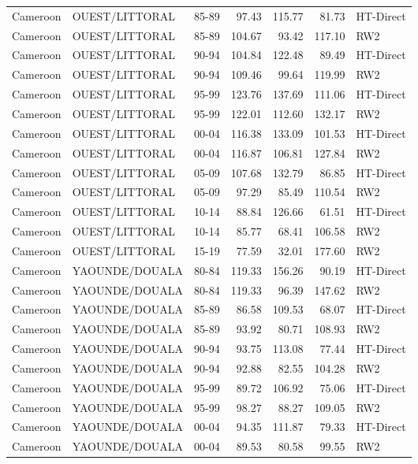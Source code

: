 \begin{longtable}{lllrrrl}
  Cameroon & OUEST/LITTORAL & 85-89 & 97.43 & 115.77 & 81.73 & HT-Direct \\ 
  Cameroon & OUEST/LITTORAL & 85-89 & 104.67 & 93.42 & 117.10 & RW2 \\ 
  Cameroon & OUEST/LITTORAL & 90-94 & 104.84 & 122.48 & 89.49 & HT-Direct \\ 
  Cameroon & OUEST/LITTORAL & 90-94 & 109.46 & 99.64 & 119.99 & RW2 \\ 
  Cameroon & OUEST/LITTORAL & 95-99 & 123.76 & 137.69 & 111.06 & HT-Direct \\ 
  Cameroon & OUEST/LITTORAL & 95-99 & 122.01 & 112.60 & 132.17 & RW2 \\ 
  Cameroon & OUEST/LITTORAL & 00-04 & 116.38 & 133.09 & 101.53 & HT-Direct \\ 
  Cameroon & OUEST/LITTORAL & 00-04 & 116.87 & 106.81 & 127.84 & RW2 \\ 
  Cameroon & OUEST/LITTORAL & 05-09 & 107.68 & 132.79 & 86.85 & HT-Direct \\ 
  Cameroon & OUEST/LITTORAL & 05-09 & 97.29 & 85.49 & 110.54 & RW2 \\ 
  Cameroon & OUEST/LITTORAL & 10-14 & 88.84 & 126.66 & 61.51 & HT-Direct \\ 
  Cameroon & OUEST/LITTORAL & 10-14 & 85.77 & 68.41 & 106.58 & RW2 \\ 
  Cameroon & OUEST/LITTORAL & 15-19 & 77.59 & 32.01 & 177.60 & RW2 \\ 
  Cameroon & YAOUNDE/DOUALA & 80-84 & 119.33 & 156.26 & 90.19 & HT-Direct \\ 
  Cameroon & YAOUNDE/DOUALA & 80-84 & 119.33 & 96.39 & 147.62 & RW2 \\ 
  Cameroon & YAOUNDE/DOUALA & 85-89 & 86.58 & 109.53 & 68.07 & HT-Direct \\ 
  Cameroon & YAOUNDE/DOUALA & 85-89 & 93.92 & 80.71 & 108.93 & RW2 \\ 
  Cameroon & YAOUNDE/DOUALA & 90-94 & 93.75 & 113.08 & 77.44 & HT-Direct \\ 
  Cameroon & YAOUNDE/DOUALA & 90-94 & 92.88 & 82.55 & 104.28 & RW2 \\ 
  Cameroon & YAOUNDE/DOUALA & 95-99 & 89.72 & 106.92 & 75.06 & HT-Direct \\ 
  Cameroon & YAOUNDE/DOUALA & 95-99 & 98.27 & 88.27 & 109.05 & RW2 \\ 
  Cameroon & YAOUNDE/DOUALA & 00-04 & 94.35 & 111.87 & 79.33 & HT-Direct \\ 
  Cameroon & YAOUNDE/DOUALA & 00-04 & 89.53 & 80.58 & 99.55 & RW2 \\ 

\end{longtable}
